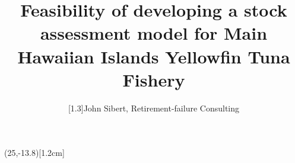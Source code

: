 \documentclass[a4paper,KOMA,landscape,titlepage]{powersem}
\begin{document}
\pageTransitionReplace
\pagecounter[on]


\freelogo(25,-13.8)[1.2cm] %



\author{\scalebox{1}[1.3]{John Sibert, Retirement-failure Consulting}} 
\title{Feasibility of developing a stock assessment model for 
Main Hawaiian Islands Yellowfin Tuna Fishery}


\address{\href{mailto:sibert@hawaii.edu}{sibert@hawaii.edu}}

\begin{slide}
\maketitle
\end{slide}

\end{document}
